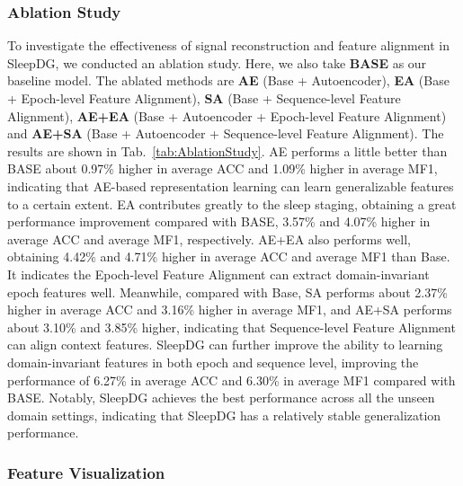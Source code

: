 \documentclass[letterpaper]{article} %
\begin{document}
	
	
	\subsubsection{Ablation Study}
	
	To investigate the effectiveness of signal reconstruction and feature alignment in SleepDG, we conducted an ablation study.
	Here, we also take \textbf{BASE} as our baseline model.
	The ablated methods are
	\textbf{AE} (Base + Autoencoder),
	\textbf{EA} (Base + Epoch-level Feature Alignment),
	\textbf{SA} (Base + Sequence-level Feature Alignment),
	\textbf{AE+EA} (Base + Autoencoder + Epoch-level Feature Alignment)
	and \textbf{AE+SA} (Base + Autoencoder + Sequence-level Feature Alignment).
	The results are shown in Tab.~\ref{tab:AblationStudy}. AE performs a little better than BASE about 0.97\% higher in average ACC and 1.09\% higher in average MF1, indicating that AE-based representation learning can learn generalizable features to a certain extent.
	EA contributes greatly to the sleep staging, obtaining a great performance improvement compared with BASE, 3.57\% and 4.07\% higher in average ACC and average MF1, respectively.
	AE+EA also performs well, obtaining 4.42\% and 4.71\% higher in average ACC and average MF1 than Base.
	It indicates the Epoch-level Feature Alignment can extract domain-invariant epoch features well.
	Meanwhile, compared with Base, SA performs about 2.37\% higher in average ACC and 3.16\% higher in average MF1, and AE+SA performs about 3.10\% and 3.85\% higher, indicating that Sequence-level Feature Alignment can align context features.
	SleepDG can further improve the ability to learning domain-invariant features in both epoch and sequence level, improving the performance of 6.27\% in average ACC and 6.30\% in average MF1 compared with BASE.
	Notably, SleepDG achieves the best performance across all the unseen domain settings, indicating that SleepDG has a relatively stable generalization performance.
	
	
	
	\subsubsection{Feature Visualization}
	
\end{document}
